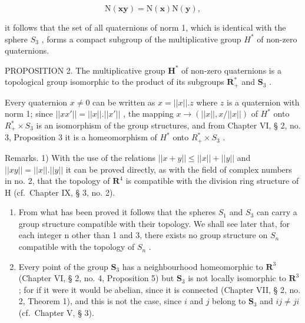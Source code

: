 \[
\mathrm{N} (\boldsymbol {x y}) = \mathrm{N} (\boldsymbol {x}) \mathrm{N} (\boldsymbol {y}),
\]

it follows that the set of all quaternions of norm 1, which is identical with the sphere \(S_{3}\) , forms a compact subgroup of the multiplicative group \(H^{*}\) of non-zero quaternions.

PROPOSITION 2. The multiplicative group \(\mathbf{H}^*\) of non-zero quaternions is a topological group isomorphic to the product of its subgroups \(\mathbf{R}_+^*\) and \(\mathbf{S}_3\) .

Every quaternion \(x \neq 0\) can be written as \(x = ||x||.z\) where \(z\) is a quaternion with norm 1; since \(||xx'|| = ||x||.||x'||\) , the mapping \(x \to (||x||, x/||x||)\) of \(H^*\) onto \(R_+^* \times S_3\) is an isomorphism of the group structures, and from Chapter VI, § 2, no. 3, Proposition 3 it is a homeomorphism of \(H^*\) onto \(R_+^* \times S_3\) .

Remarks. 1) With the use of the relations \(||x + y|| \leqslant ||x|| + ||y||\) and \(||xy|| = ||x||.||y||\) it can be proved directly, as with the field of complex numbers in no. 2, that the topology of \(\mathbf{R}^4\) is compatible with the division ring structure of H (cf.~Chapter IX, § 3, no. 2).

\begin{enumerate}
\def\labelenumi{\arabic{enumi})}
\setcounter{enumi}{1}
\item
  From what has been proved it follows that the spheres \(S_{1}\) and \(S_{3}\) can carry a group structure compatible with their topology. We shall see later that, for each integer n other than 1 and 3, there exists no group structure on \(S_{n}\) compatible with the topology of \(S_{n}\) .
\item
  Every point of the group \(\mathbf{S}_3\) has a neighbourhood homeomorphic to \(\mathbf{R}^3\) (Chapter VI, § 2, no. 4, Proposition 5) but \(\mathbf{S}_3\) is not locally isomorphic to \(\mathbf{R}^3\) ; for if it were it would be abelian, since it is connected (Chapter VII, § 2, no. 2, Theorem 1), and this is not the case, since \(i\) and \(j\) belong to \(\mathbf{S}_3\) and \(ij \neq ji\) (cf.~Chapter V, § 3).
\end{enumerate}

